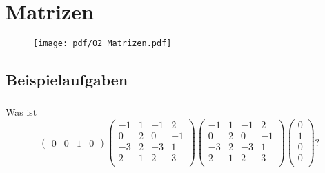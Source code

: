 \section{Matrizen}
\begin{figure}[h!]
    \texttt{[image: pdf/02\_Matrizen.pdf]}
\end{figure}
\newpage



\subsection{Beispielaufgaben} 

\vspace{1cm}

\subsubsection{} %
Was ist
\begin{equation*}
    \begin{pmatrix}
    0 & 0 & 1 & 0
    \end{pmatrix}
    \begin{pmatrix}
    -1 & 1 & -1 & 2 \\
    0 & 2 & 0 & -1 \\
    -3 & 2 & -3 & 1 \\
    2 & 1 & 2 & 3 \\
    \end{pmatrix}
    \begin{pmatrix}
    -1 & 1 & -1 & 2 \\
    0 & 2 & 0 & -1 \\
    -3 & 2 & -3 & 1 \\
    2 & 1 & 2 & 3 \\
    \end{pmatrix}
    \begin{pmatrix}
    0\\
    1\\
    0\\
    0\\
    \end{pmatrix}?
\end{equation*}

\vspace{1\baselineskip}


